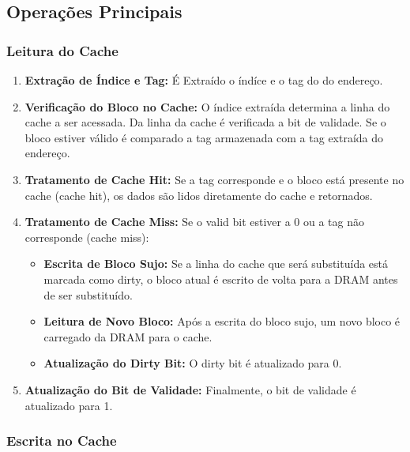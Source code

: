 \documentclass{article}
\begin{document}
\subsection{Operações Principais}

\subsubsection{Leitura do Cache}

\begin{enumerate}
    \item \textbf{Extração de Índice e Tag:} É Extraído o índíce e o tag do
    do endereço.

    \item \textbf{Verificação do Bloco no Cache:} O índice extraída determina a linha do cache a ser acessada. Da linha da cache é verificada a bit de validade. Se o bloco estiver válido é comparado a tag armazenada com a tag extraída do endereço.

    \item \textbf{Tratamento de Cache Hit:} Se a tag corresponde e o bloco está presente no cache (cache hit), os dados são lidos diretamente do cache e retornados.

    \item \textbf{Tratamento de Cache Miss:} Se o valid bit estiver a 0 ou a tag não corresponde (cache miss):
    \begin{itemize}
        \item \textbf{Escrita de Bloco Sujo:} Se a linha do cache que será substituída está marcada como dirty, o bloco atual é escrito de volta para a DRAM antes de ser substituído.

        \item \textbf{Leitura de Novo Bloco:} Após a escrita do bloco sujo, um novo bloco é carregado da DRAM para o cache. 

        \item \textbf{Atualização do Dirty Bit:} O dirty bit é atualizado para 0.
    \end{itemize}

    \item \textbf{Atualização do Bit de Validade:} Finalmente, o bit de validade é atualizado para 1. 
    
\end{enumerate}


\subsubsection{Escrita no Cache}
\end{document}

